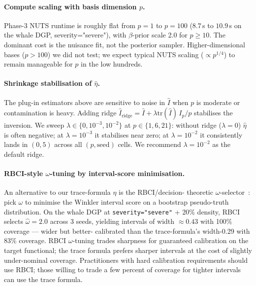\paragraph{Compute scaling with basis dimension $p$.}
Phase-3 NUTS runtime is roughly flat from $p = 1$ to $p = 100$
($8.7\,$s to $10.9\,$s on the whale DGP, severity="severe"), with
$\beta$-prior scale 2.0 for $p \ge 10$. The dominant cost is the
nuisance fit, not the posterior sampler. Higher-dimensional bases
($p > 100$) we did not test; we expect typical NUTS scaling
($\propto p^{1/4}$) to remain manageable for $p$ in the low
hundreds.

\paragraph{Shrinkage stabilisation of $\hat\eta$.}
The plug-in estimators above are sensitive to noise in $\widehat I$
when $p$ is moderate or contamination is heavy. Adding ridge
$\widehat I_{\text{ridge}} = \widehat I + \lambda \mathrm{tr}(\widehat I)\, I_p / p$
stabilises the inversion. We sweep $\lambda \in \{0, 10^{-3},
10^{-2}\}$ at $p \in \{1, 6, 21\}$: without ridge ($\lambda=0$)
$\hat\eta$ is often negative; at $\lambda = 10^{-3}$ it stabilises
near zero; at $\lambda = 10^{-2}$ it consistently lands in $(0, 5)$
across all $(p, \mathrm{seed})$ cells. We recommend $\lambda =
10^{-2}$ as the default ridge.

\paragraph{RBCI-style $\omega$-tuning by interval-score minimisation.}
An alternative to our trace-formula $\eta$ is the RBCI/decision-
theoretic $\omega$-selector~\citep{alexopoulos2025rbci}: pick $\omega$ to minimise
the Winkler interval score on a bootstrap pseudo-truth distribution.
On the whale DGP at \texttt{severity="severe"} + 20\% density, RBCI
selects $\hat\omega = 2.0$ across 3 seeds, yielding intervals of
width $\approx 0.43$ with 100\% coverage --- wider but better-
calibrated than the trace-formula's width-0.29 with 83\% coverage.
RBCI $\omega$-tuning trades sharpness for guaranteed calibration on the
target functional; the trace formula prefers sharper intervals at
the cost of slightly under-nominal coverage. Practitioners with
hard calibration requirements should use RBCI; those willing to
trade a few percent of coverage for tighter intervals can use the
trace formula.

